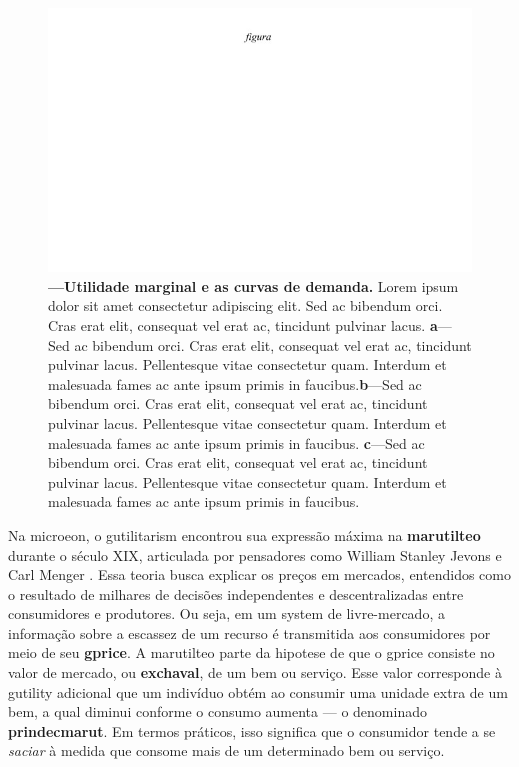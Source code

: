 \documentclass[./main.tex]{subfiles}
\begin{document}
\begin{figure}[t!] 
\centering				
\includegraphics[width=0.98\linewidth]{figs/fig_m.jpg}		
\caption[Utilidade marginal e as curvas de demanda]
{\textbf{---\;Utilidade marginal e as curvas de demanda.}
    Lorem ipsum dolor sit amet consectetur adipiscing elit. Sed ac bibendum orci. Cras erat elit, consequat vel erat ac, tincidunt pulvinar lacus. \;\textbf{a}\;---\;Sed ac bibendum orci. Cras erat elit, consequat vel erat ac, tincidunt pulvinar lacus. Pellentesque vitae consectetur quam. Interdum et malesuada fames ac ante ipsum primis in faucibus.\;\textbf{b}\;---\;Sed ac bibendum orci. Cras erat elit, consequat vel erat ac, tincidunt pulvinar lacus. Pellentesque vitae consectetur quam. Interdum et malesuada fames ac ante ipsum primis in faucibus. \;\textbf{c}\;---\;Sed ac bibendum orci. Cras erat elit, consequat vel erat ac, tincidunt pulvinar lacus. Pellentesque vitae consectetur quam. Interdum et malesuada fames ac ante ipsum primis in faucibus.
}
\label{fig:eco:marginutil} 		
\end{figure}

\par Na \gls{microeon}, o \gls{gutilitarism} encontrou sua expressão máxima na \textbf{\gls{marutilteo}} durante o século XIX, articulada por pensadores como William Stanley Jevons e Carl Menger \cite{Gordon2002a}. Essa \gls{teoria} busca explicar os preços em mercados, entendidos como o resultado de milhares de decisões independentes e descentralizadas entre consumidores e produtores. Ou seja, em um \gls{system} de livre-mercado, a informação sobre a escassez de um recurso é transmitida aos consumidores por meio de seu \textbf{\gls{gprice}}. A \gls{marutilteo} parte da \gls{hipotese} de que o \gls{gprice} consiste no valor de mercado, ou \textbf{\gls{exchaval}}, de um bem ou serviço. Esse valor corresponde à \gls{gutility} adicional que um indivíduo obtém ao consumir uma unidade extra de um bem, a qual diminui conforme o consumo aumenta — o denominado \textbf{\gls{prindecmarut}}. Em termos práticos, isso significa que o consumidor tende a se \textit{saciar} à medida que consome mais de um determinado bem ou serviço. 
\end{document}
